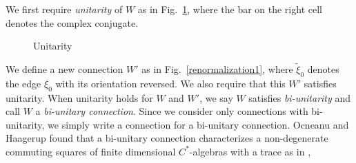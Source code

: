 \documentclass[12pt]{article}
\begin{document}
We first require {\em unitarity} of $W$ 
as in Fig.~\ref{unitarity}, where the bar on the right cell
denotes the complex conjugate.

\begin{figure}[H]
\begin{center}
\caption{Unitarity}
\label{unitarity}
\end{center}
\end{figure}

We define a new connection $W'$ as
in Fig.~\ref{renormalization1}, where $\tilde\xi_0$  
denotes the edge $\xi_0$ with its orientation reversed.
We also require that
this $W'$ satisfies unitarity.  When unitarity holds for
$W$ and $W'$, we say $W$ satisfies {\em bi-unitarity}
and call $W$ a {\em bi-unitary connection}.  Since
we consider only connections with bi-unitarity, we 
simply write a connection for a bi-unitary connection.
Ocneanu and Haagerup found that
a bi-unitary connection characterizes a 
non-degenerate commuting squares of finite dimensional
$C^*$-algebras with a trace as in \cite[Section 11.2]{EK1},
\end{document}
